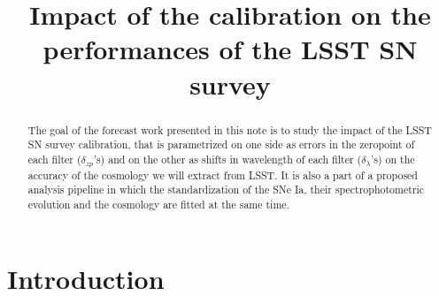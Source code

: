\documentclass[\docopts]{\docclass}
\begin{document}
\title{ Impact of the calibration on the performances of the LSST SN survey }

\maketitlepre

\begin{abstract}
The goal of the forecast work presented in this note is to study the impact of the LSST SN survey calibration, that is parametrized on one side as errors in the zeropoint of each filter ($\delta_{zp}$'s) and on the other as shifts in wavelength of each filter ($\delta_\lambda$'s) on the accuracy of the cosmology we will extract from LSST.
It is also a part of a proposed analysis pipeline in which the standardization of the SNe Ia, their spectrophotometric evolution and the cosmology are fitted at the same time.
\end{abstract}


\maketitlepost

% 

\section{Introduction}
\label{sec:intro}
\end{document}
